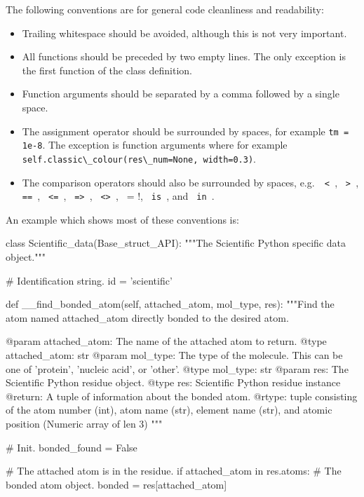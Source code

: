 The following conventions are for general code cleanliness and readability:

\begin{itemize}
\item Trailing whitespace should be avoided, although this is not very important.
\item All functions should be preceded by two empty lines.  The only exception is the first function of the class definition.
\item Function arguments should be separated by a comma followed by a single space.
\item The assignment operator should be surrounded by spaces, for example \verb*!tm = 1e-8!.  The exception is function arguments where for example \verb*!self.classic\_colour(res\_num=None, width=0.3)!.
\item The comparison operators should also be surrounded by spaces, e.g.\ \verb*! < !, \verb*! > !, \verb*! == !, \verb*! <= !, \verb*! => !, \verb*! <> !, \verb*! != !, \verb*! is !, and \verb*! in !.
\end{itemize}

An example which shows most of these conventions is:
\begin{footnotesize}
\begin{verbatim*}
class Scientific_data(Base_struct_API):
    """The Scientific Python specific data object."""

    # Identification string.
    id = 'scientific'


    def __find_bonded_atom(self, attached_atom, mol_type, res):
        """Find the atom named attached_atom directly bonded to the desired atom.

        @param attached_atom:   The name of the attached atom to return.
        @type attached_atom:    str
        @param mol_type:        The type of the molecule.  This can be one of 'protein', 'nucleic acid',
                                or 'other'.
        @type mol_type:         str
        @param res:             The Scientific Python residue object.
        @type res:              Scientific Python residue instance
        @return:                A tuple of information about the bonded atom.
        @rtype:                 tuple consisting of the atom number (int), atom name (str), element
                                name (str), and atomic position (Numeric array of len 3)
        """

        # Init.
        bonded_found = False

        # The attached atom is in the residue.
        if attached_atom in res.atoms:
            # The bonded atom object.
            bonded = res[attached_atom]
\end{verbatim*}
\end{footnotesize}




